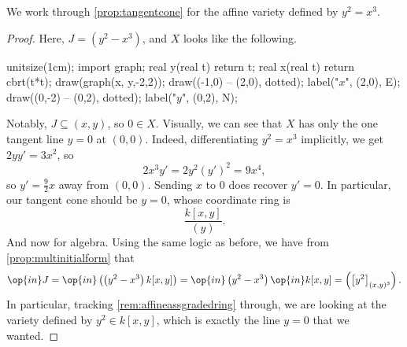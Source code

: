 

\begin{exe}
	We work through \autoref{prop:tangentcone} for the affine variety defined by $y^2=x^3$.
\end{exe}
\begin{proof}
	Here, $J=\left(y^2-x^3\right)$, and $X$ looks like the following.
	\begin{center}
		\begin{asy}
			unitsize(1cm);
			import graph;
			real y(real t)
			{
				return t;
			}
			real x(real t)
			{
				return cbrt(t*t);
			}
			draw(graph(x, y,-2,2));
			draw((-1,0) -- (2,0), dotted); label("$x$", (2,0), E);
			draw((0,-2) -- (0,2), dotted); label("$y$", (0,2), N);
		\end{asy}
	\end{center}
	Notably, $J\subseteq(x,y)$, so $0\in X$. Visually, we can see that $X$ has only the one tangent line $y=0$ at $(0,0)$. Indeed, differentiating $y^2=x^3$ implicitly, we get $2yy'=3x^2$, so
	\[2x^3y'=2y^2(y')^2=9x^4,\]
	so $y'=\frac92x$ away from $(0,0)$. Sending $x$ to $0$ does recover $y'=0$. In particular, our tangent cone should be $y=0$, whose coordinate ring is
	\[\frac{k[x,y]}{(y)}.\]
	And now for algebra. Using the same logic as before, we have from \autoref{prop:multinitialform} that
	\[\op{in}J=\op{in}\left(\left(y^2-x^3\right)k[x,y]\right)=\op{in}\left(y^2-x^3\right)\op{in}k[x,y]=\left(\left[y^2\right]_{(x,y)^3}\right).\]
	In particular, tracking \autoref{rem:affineassgradedring} through, we are looking at the variety defined by $y^2\in k[x,y]$, which is exactly the line $y=0$ that we wanted.
\end{proof}

